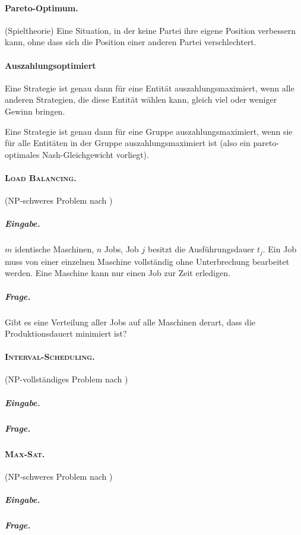 \documentclass[12pt,twoside]{article}
\theoremstyle{plain}
\theoremstyle{definition}
\theoremstyle{remark}
\newcommand{\ints}{\textsc{Interval-Scheduling}}
\newcommand{\msat}{\textsc{Max-Sat}}
\newcommand{\lb}{\textsc{Load Balancing}}
\begin{document}
\paragraph*{Pareto-Optimum.}
	\label{def:st:pareto}
	(Spieltheorie) Eine Situation, in der keine Partei ihre eigene Position verbessern kann, ohne dass sich die Position einer anderen Partei verschlechtert.
\paragraph*{Auszahlungsoptimiert}
	\label{def:st:auszahlung}
	Eine Strategie ist genau dann für eine Entität auszahlungsmaximiert, wenn alle anderen Strategien, die diese Entität wählen kann, gleich viel oder weniger Gewinn bringen.
	
	Eine Strategie ist genau dann für eine Gruppe auszahlungsmaximiert, wenn sie für alle Entitäten in der Gruppe auszahlungsmaximiert ist (also ein pareto-optimales Nash-Gleichgewicht vorliegt).
\paragraph*{\lb .}
	\label{def:prob:load-balancing}
	(NP-schweres Problem nach \cite{Andreae2016})
		\subparagraph*{Eingabe.}$m$ identische Maschinen, $n$ Jobs, Job $j$ besitzt die Ausführungsdauer $t_j$.
		Ein Job muss von einer einzelnen Maschine vollständig ohne Unterbrechung bearbeitet werden.
		Eine Maschine kann nur einen Job zur Zeit erledigen.
		\subparagraph*{Frage.} Gibt es eine Verteilung aller Jobs auf alle Maschinen derart, dass die Produktionsdauert minimiert ist?
\paragraph*{\ints .}
	\label{def:prob:interval-scheduling}
	(NP-vollständiges Problem nach \cite{Andreae2016})
		\subparagraph*{Eingabe.}
		\subparagraph*{Frage.}
\paragraph*{\msat .}
	\label{def:prob:max-sat}
	(NP-schweres Problem nach \cite{Andreae2016})
		\subparagraph*{Eingabe.}
		\subparagraph*{Frage.}


\nocite{*}
\end{document}

